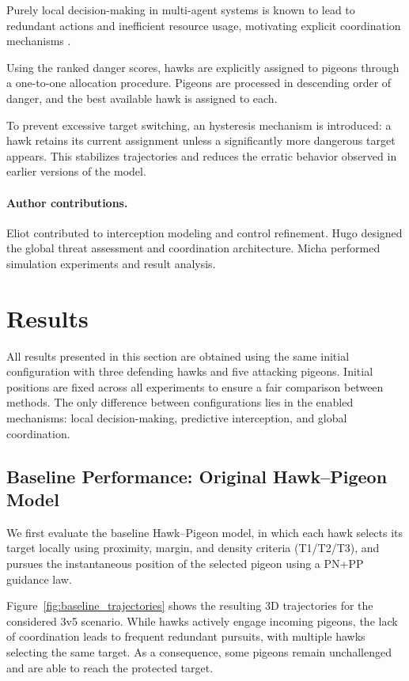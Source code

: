 \documentclass[a4paper,11pt,twocolumn]{article}
\begin{document}
Purely local decision-making in multi-agent systems is known to lead to redundant actions and inefficient resource usage, motivating explicit coordination mechanisms \cite{parker1998alliance}.

Using the ranked danger scores, hawks are explicitly assigned to pigeons through a one-to-one allocation procedure. Pigeons are processed in descending order of danger, and the best available hawk is assigned to each.

To prevent excessive target switching, an hysteresis mechanism is introduced: a hawk retains its current assignment unless a significantly more dangerous target appears. This stabilizes trajectories and reduces the erratic behavior observed in earlier versions of the model.

\paragraph{Author contributions.}
Eliot contributed to interception modeling and control refinement.
Hugo designed the global threat assessment and coordination architecture.
Micha performed simulation experiments and result analysis.

\section{Results}

All results presented in this section are obtained using the same initial
configuration with three defending hawks and five attacking pigeons.
Initial positions are fixed across all experiments to ensure a fair
comparison between methods. The only difference between configurations
lies in the enabled mechanisms: local decision-making, predictive
interception, and global coordination.

\subsection{Baseline Performance: Original Hawk--Pigeon Model}

We first evaluate the baseline Hawk--Pigeon model, in which each hawk
selects its target locally using proximity, margin, and density criteria
(T1/T2/T3), and pursues the instantaneous position of the selected pigeon
using a PN+PP guidance law.

Figure~\ref{fig:baseline_trajectories} shows the resulting 3D trajectories
for the considered 3v5 scenario. While hawks actively engage incoming
pigeons, the lack of coordination leads to frequent redundant pursuits,
with multiple hawks selecting the same target. As a consequence, some
pigeons remain unchallenged and are able to reach the protected target.
\end{document}
